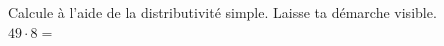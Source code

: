 %
%
    Calcule à l'aide de la distributivité simple. Laisse ta démarche visible. \\

    \(49 \cdot 8 =\)
    \vspace{3cm}
